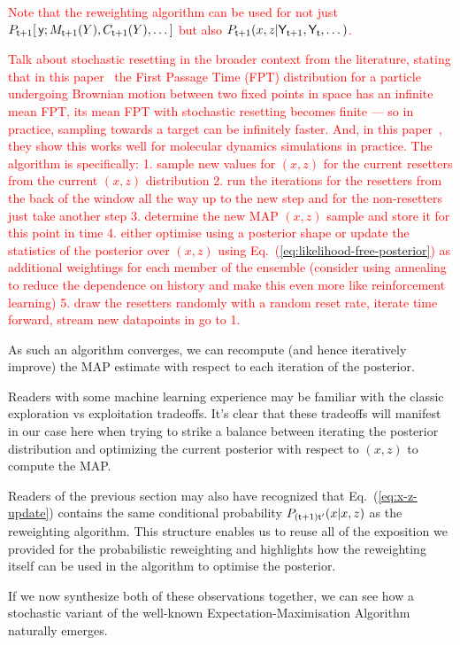 \textcolor{red}{Note that the reweighting algorithm can be used for not just $P_{{\sf t}+1}[\,{\sf y};M_{{\sf t}+1}(Y),C_{{\sf t}+1}(Y), \dots ]$ but also $P_{{\sf t}+1}(x,z\vert {\sf Y}_{{\sf t}+1}, {\sf Y}_{{\sf t}}, \dots )$.}

\textcolor{red}{Talk about stochastic resetting in the broader context from the literature, stating that in this paper~\cite{evans2011diffusion} the First Passage Time (FPT) distribution for a particle undergoing Brownian motion between two fixed points in space has an infinite mean FPT, its mean FPT with stochastic resetting becomes finite --- so in practice, sampling towards a target can be infinitely faster. And, in this paper~\cite{blumer2022stochastic}, they show this works well for molecular dynamics simulations in practice. 
The algorithm is specifically: 
1. sample new values for $(x,z)$ for the current resetters from the current $(x,z)$ distribution
2. run the iterations for the resetters from the back of the window all the way up to the new step and for the non-resetters just take another step
3. determine the new MAP $(x,z)$ sample and store it for this point in time 
4. either optimise using a posterior shape or update the statistics of the posterior over $(x,z)$ using Eq.~(\ref{eq:likelihood-free-posterior}) as additional weightings for each member of the ensemble (consider using annealing to reduce the dependence on history and make this even more like reinforcement learning)
5. draw the resetters randomly with a random reset rate, iterate time forward, stream new datapoints in go to 1.}


As such an algorithm converges, we can recompute (and hence iteratively improve) the MAP estimate with respect to each iteration of the posterior.

Readers with some machine learning experience may be familiar with the classic exploration vs exploitation tradeoffs. It's clear that these tradeoffs will manifest in our case here when trying to strike a balance between iterating the posterior distribution and optimizing the current posterior with respect to $(x,z)$ to compute the MAP. 

Readers of the previous section may also have recognized that Eq.~(\ref{eq:x-z-update}) contains the same conditional probability $P_{({\sf t}+1){\sf t}'}(x\vert x,z)$ as the reweighting algorithm. This structure enables us to reuse all of the exposition we provided for the probabilistic reweighting and highlights how the reweighting itself can be used in the algorithm to optimise the posterior.   

If we now synthesize both of these observations together, we can see how a stochastic variant of the well-known Expectation-Maximisation Algorithm~\cite{hartley1958maximum, dempster1977maximum, murphy2012machine} naturally emerges.


